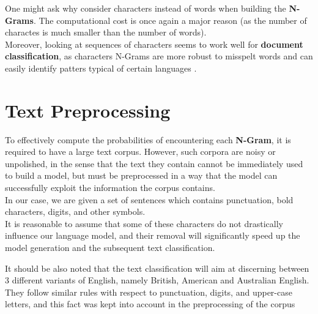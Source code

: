 \documentclass[
12pt,
a4paper,
oneside,
headinclude,
footinclude]{article}
\theoremstyle{definition} %
\begin{document}
One might ask why consider characters instead of words when building the \textbf{N-Grams}. The computational cost is once again a major reason (as the number of charactes is much smaller than the number of words).\\
Moreover, looking at sequences of characters seems to work well for \textbf{document classification},  as characters N-Grams are more robust to misspelt words and can easily identify patters typical of certain languages \cite{cavnar1994n}.


\section{Text Preprocessing}
To effectively compute the probabilities of encountering each \textbf{N-Gram}, it is required to have a large text corpus. However, such corpora are noisy or unpolished, in the sense that the text they contain cannot be immediately used to build a model, but must be preprocessed in a way that the model can successfully exploit the information the corpus contains.\\

In our case, we are given a set of sentences which contains punctuation, bold characters, digits, and other symbols.\\
It is reasonable to assume that some of these characters do not drastically influence our language model, and their removal will significantly speed up the model generation and the subsequent text classification.

It should be also noted that the text classification will aim at discerning between 3 different variants of English, namely British, American and Australian English. They follow similar rules with respect to punctuation, digits, and upper-case letters, and this fact was kept into account in the preprocessing of the corpus 
\end{document}
